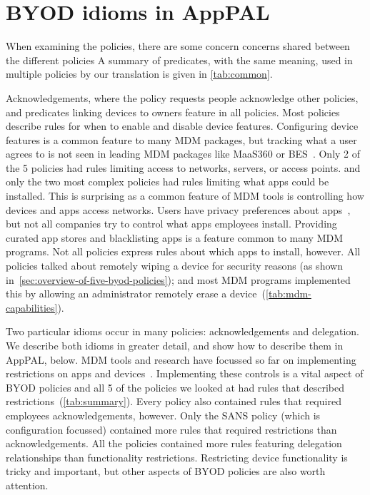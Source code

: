 \documentclass[thesis.tex]{subfiles}
\begin{document}
\section{BYOD idioms in AppPAL}
\label{sec:common_concerns}

When examining the policies, there are some concern concerns shared between the different policies
A summary of predicates, with the same meaning, used in multiple policies by our translation is given in \autoref{tab:common}.

Acknowledgements, where the policy requests people acknowledge other policies, and predicates linking devices to owners feature in all policies.
Most policies describe rules for when to enable and disable device features.
Configuring device features is a common feature to many \ac{MDM} packages, but tracking what a user agrees to is not seen in leading \ac{MDM} packages like MaaS360 or BES~\cite{rob_smith_magic_2016}.
Only 2 of the 5 policies had rules limiting access to networks, servers, or access points.
  and only the two most complex policies had rules limiting what apps could be installed.
This is surprising as a common feature of \ac{MDM} tools is controlling how devices and apps access networks.
Users have privacy preferences about apps~\cite{lin_modeling_2014}, but not all companies try to control what apps employees install.
Providing curated app stores and blacklisting apps is a feature common to many \ac{MDM} programs.
Not all policies express rules about which apps to install, however.
All policies talked about remotely wiping a device for security reasons (as shown in~\autoref{sec:overview-of-five-byod-policies});
and most \ac{MDM} programs implemented this by allowing an administrator remotely erase a device~(\autoref{tab:mdm-capabilities}).

Two particular idioms occur in many policies: acknowledgements and delegation.
We describe both idioms in greater detail, and show how to describe them in AppPAL, below.
MDM tools and research have focussed so far on implementing restrictions on apps and devices~\cite{_ibm_????,armando_formal_2014,martinelli_enhancing_2016}.
Implementing these controls is a vital aspect of BYOD policies and all 5 of the policies we looked at had rules that described restrictions~(\autoref{tab:summary}).
Every policy also contained rules that required employees acknowledgements, however.
Only the SANS policy (which is configuration focussed) contained more rules that required restrictions than acknowledgements.
All the policies contained more rules featuring delegation relationships than functionality restrictions.
Restricting device functionality is tricky and important, but other aspects of BYOD policies are also worth attention.
\end{document}
